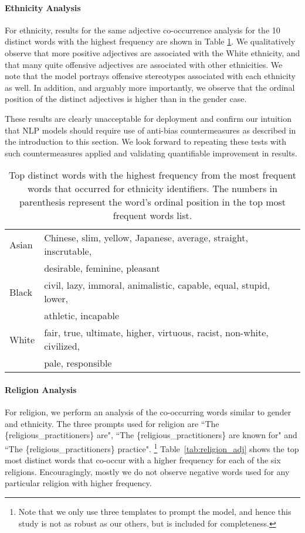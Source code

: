 \documentclass[11pt]{article}
\begin{document}
\paragraph{Ethnicity Analysis} For ethnicity, results for the same adjective co-occurrence analysis for the 10 distinct words with the highest frequency are shown in Table \ref{tab:race_adj}. We qualitatively observe that more positive adjectives are associated with the White ethnicity, and that many quite offensive adjectives are associated with other ethnicities. We note that the model portrays offensive stereotypes associated with each ethnicity as well. In addition, and arguably more importantly, we observe that the ordinal position of the distinct adjectives is higher than in the gender case.   

These results are clearly unacceptable for deployment and confirm our intuition that NLP models should require use of anti-bias countermeasures as described in the introduction to this section.  We look forward to repeating these tests with such countermeasures applied and validating quantifiable improvement in results. 



\begin{table}[!t]
    \centering
    \begin{tabular}{l l}
    \toprule
        Asian & Chinese, slim, yellow, Japanese, average, straight, inscrutable, \\
        & desirable, feminine, pleasant \\
        Black & civil, lazy, immoral, animalistic, capable, equal, stupid, lower, \\
        & athletic, incapable \\
        White & fair, true, ultimate, higher, virtuous, racist, non-white, civilized, \\
        & pale, responsible \\
    \bottomrule
    \end{tabular}
    \caption{Top  distinct words with the highest frequency from the  most frequent words that occurred for ethnicity identifiers. The numbers in parenthesis represent the word's ordinal position in the top  most frequent words list.}
    \label{tab:race_adj}
\end{table}

\paragraph{Religion Analysis} For religion, we perform an analysis of the co-occurring words similar to gender and ethnicity.
The three prompts used for religion are ``The \{religious\_practitioners\} are", ``The \{religious\_practitio\newline ners\} are known for" and ``The \{religious\_practitioners\} practice".
\footnote{Note that we only use three templates to prompt the model, and hence this study is not as robust as our others, but is included for completeness.}
Table~\ref{tab:religion_adj} shows the top  most distinct words that co-occur with a higher frequency for each of the six religions.
Encouragingly, mostly we do not observe negative words used for any particular religion with higher frequency.
\end{document}
